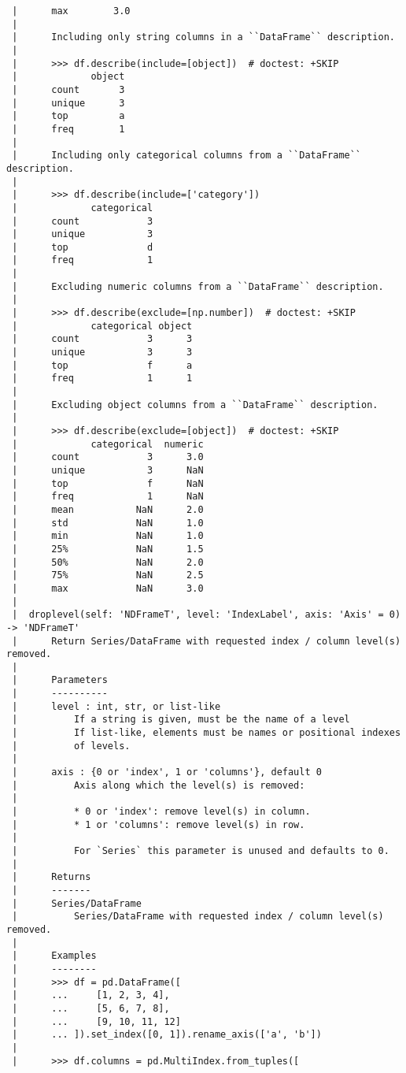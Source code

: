 \documentclass[
  letterpaper,
  DIV=11,
  numbers=noendperiod]{scrreprt}
\begin{document}
\begin{verbatim}
 |      max        3.0
 |      
 |      Including only string columns in a ``DataFrame`` description.
 |      
 |      >>> df.describe(include=[object])  # doctest: +SKIP
 |             object
 |      count       3
 |      unique      3
 |      top         a
 |      freq        1
 |      
 |      Including only categorical columns from a ``DataFrame`` description.
 |      
 |      >>> df.describe(include=['category'])
 |             categorical
 |      count            3
 |      unique           3
 |      top              d
 |      freq             1
 |      
 |      Excluding numeric columns from a ``DataFrame`` description.
 |      
 |      >>> df.describe(exclude=[np.number])  # doctest: +SKIP
 |             categorical object
 |      count            3      3
 |      unique           3      3
 |      top              f      a
 |      freq             1      1
 |      
 |      Excluding object columns from a ``DataFrame`` description.
 |      
 |      >>> df.describe(exclude=[object])  # doctest: +SKIP
 |             categorical  numeric
 |      count            3      3.0
 |      unique           3      NaN
 |      top              f      NaN
 |      freq             1      NaN
 |      mean           NaN      2.0
 |      std            NaN      1.0
 |      min            NaN      1.0
 |      25%            NaN      1.5
 |      50%            NaN      2.0
 |      75%            NaN      2.5
 |      max            NaN      3.0
 |  
 |  droplevel(self: 'NDFrameT', level: 'IndexLabel', axis: 'Axis' = 0) -> 'NDFrameT'
 |      Return Series/DataFrame with requested index / column level(s) removed.
 |      
 |      Parameters
 |      ----------
 |      level : int, str, or list-like
 |          If a string is given, must be the name of a level
 |          If list-like, elements must be names or positional indexes
 |          of levels.
 |      
 |      axis : {0 or 'index', 1 or 'columns'}, default 0
 |          Axis along which the level(s) is removed:
 |      
 |          * 0 or 'index': remove level(s) in column.
 |          * 1 or 'columns': remove level(s) in row.
 |      
 |          For `Series` this parameter is unused and defaults to 0.
 |      
 |      Returns
 |      -------
 |      Series/DataFrame
 |          Series/DataFrame with requested index / column level(s) removed.
 |      
 |      Examples
 |      --------
 |      >>> df = pd.DataFrame([
 |      ...     [1, 2, 3, 4],
 |      ...     [5, 6, 7, 8],
 |      ...     [9, 10, 11, 12]
 |      ... ]).set_index([0, 1]).rename_axis(['a', 'b'])
 |      
 |      >>> df.columns = pd.MultiIndex.from_tuples([

\end{verbatim}
\end{document}
